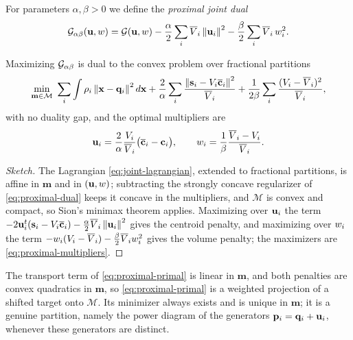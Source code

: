 \documentclass[main.tex]{subfiles}
\providecommand{\momset}{\mathcal{M}}            %
\providecommand{\mom}{\mathbf{m}}                %
\providecommand{\momx}{\mathbf{s}}               %
\providecommand{\regdual}{\jointdual_{\alpha\beta}} %
\begin{document}
For parameters $\alpha, \beta > 0$ we define the \emph{proximal joint dual}
\begin{equation}
  \regdual(\shift, \weight)
  = \jointdual(\shift, \weight)
  - \frac{\alpha}{2} \sum_i \pvol_i \norm{\shift_i}^2
  - \frac{\beta}{2} \sum_i \pvol_i \, \weight_i^2 .
  \label{eq:proximal-dual}
\end{equation}

\begin{proposition}
\label{prop:proximal-primal}
Maximizing $\regdual$ is dual to the convex problem over fractional partitions
\begin{equation}
  \min_{\mom \in \momset} \
  \sum_i \int \rho_i \norm{\xx - \qq_i}^2 d\xx
  + \frac{2}{\alpha} \sum_i \frac{\norm{\momx_i - \cellvol_i \tcentroid_i}^2}{\pvol_i}
  + \frac{1}{2\beta} \sum_i \frac{(\cellvol_i - \pvol_i)^2}{\pvol_i} ,
  \label{eq:proximal-primal}
\end{equation}
with no duality gap, and the optimal multipliers are
\begin{equation}
  \mathbf{u}_i = \frac{2}{\alpha} \frac{V_i}{\overline{V}_i} \bigl( \overline{\mathbf{c}}_i - \mathbf{c}_i \bigr) ,
  \qquad
  w_i = \frac{1}{\beta} \frac{\overline{V}_i - V_i}{\overline{V}_i} .
  \label{eq:proximal-multipliers}
\end{equation}
\end{proposition}

\begin{proof}[Sketch]
The Lagrangian \eqref{eq:joint-lagrangian}, extended to fractional partitions, is affine in $\mom$ and in $(\mathbf{u}, w)$; subtracting the strongly concave regularizer of \eqref{eq:proximal-dual} keeps it concave in the multipliers, and $\momset$ is convex and compact, so Sion's minimax theorem applies.
Maximizing over $\mathbf{u}_i$ the term $-2\shift_i\tr(\momx_i - \cellvol_i\tcentroid_i) - \frac{\alpha}{2}\pvol_i\norm{\shift_i}^2$ gives the centroid penalty, and maximizing over $w_i$ the term $-w_i(V_i - \overline{V}_i) - \frac{\beta}{2}\overline{V}_iw_i^2$ gives the volume penalty; the maximizers are \eqref{eq:proximal-multipliers}.
\end{proof}

The transport term of \eqref{eq:proximal-primal} is linear in $\mom$, and both penalties are convex quadratics in $\mom$, so \eqref{eq:proximal-primal} is a weighted projection of a shifted target onto $\momset$.
Its minimizer always exists and is unique in $\mom$; it is a genuine partition, namely the power diagram of the generators $\mathbf{p}_i = \mathbf{q}_i + \mathbf{u}_i$, whenever these generators are distinct.
\end{document}
